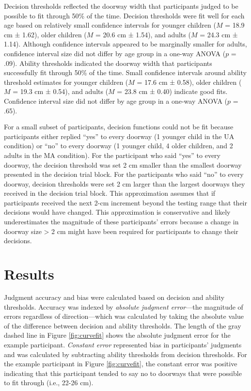 \documentclass[a4paper,man,natbib,floatsintext,noextraspace]{apa6}
\begin{document}
Decision thresholds reflected the doorway width that participants judged to be possible to fit through 50\% of the time. Decision thresholds were fit well for each age based on relatively small confidence intervals for younger children ($M$ = 18.9 cm ± 1.62), older children ($M$ = 20.6 cm ± 1.54), and adults ($M$ = 24.3 cm ± 1.14). Although confidence intervals appeared to be marginally smaller for adults, confidence interval size did not differ by age group in a one-way ANOVA ($p$ = .09). Ability thresholds indicated the doorway width that participants successfully fit through 50\% of the time. Small confidence intervals around ability threshold estimates for younger children ($M$ = 17.6 cm ± 0.58), older children ($M$ = 19.3 cm ± 0.54), and adults ($M$ = 23.8 cm ± 0.40) indicate good fits. Confidence interval size did not differ by age group in a one-way ANOVA ($p$ = .65).

For a small subset of participants, decision functions could not be fit because participants either replied “yes” to every doorway (1 younger child in the UA condition) or “no” to every doorway (1 younger child, 4 older children, and 2 adults in the MA condition). For the participant who said “yes” to every doorway, the decision threshold was set 2 cm smaller than the smallest doorway presented in the decision trial block. For the participants who said “no” to every doorway, decision thresholds were set 2 cm larger than the largest doorways they received in the decision trial block. This approximation assumes that if participants received the next 2-cm increment beyond the testing range that their decisions would have changed. This approximation is conservative and likely underestimates the magnitude of these participants’ errors because a change in doorway size > 2 cm might have been required for participants to change their decisions. 

\section{Results}

Judgment accuracy and bias were calculated based on decision and ability thresholds. Accuracy was indexed by \textit{absolute judgment error}---the magnitude of errors regardless of direction---which was calculated by taking the absolute value of the difference between decision and ability thresholds. The length of the gray dashed line in Figure \ref{fig:curvefit} shows the absolute judgment error for the example participant. \textit{Constant error} represented bias in participants’ judgments and was calculated by subtracting ability thresholds from decision thresholds. For the example participant in Figure \ref{fig:curvefit}, the constant error was positive indicating that this participant tended to say no to doorways that were possible to fit through (i.e., 22-26 cm).
\end{document}
